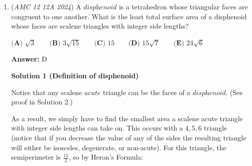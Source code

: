 \begin{enumerate}
 



\textbf{Solution 11 (Options)}

For this question, there are five options: \(28\), \(68\), \(70\), \(72\), and \(84\). Since \(28\) is too small and \(84\) is too large, these two options can be eliminated. At this point, only three options remain. While one could make a guess here, it is better to analyze these remaining options further. When we divide each of these three options by \(2\), we get \(34\), \(35\), and \(36\) respectively. Option C (\(70\)) should be eliminated because, after division by \(2\), it is the only odd number among the three results. Last but not least, Option D (\(72\)) appears excessively frequently in AMC answer choices. Therefore, it is reasonable to conjecture that the Mathematical Association of America (MAA) will avoid using this option again for AMC, leading to the elimination of D. As a result, the only remaining option is B (\(68\)).

 Curator note: Upon extensive investigation, we have been forced to conclude that the above solution is pure undistilled yap.

 Curator\_2 note: He knew the answer and used the solution to make the cheese.

 \href{https://mathproblemsolvingskills.wordpress.com/}{MathProblemSolvingSkills.com}

 


 


	\item (\textit{AMC 12 12A 2024}) A $\textit{disphenoid}$ is a tetrahedron whose triangular faces are congruent to one another. What is the least total surface area of a disphenoid whose faces are scalene triangles with integer side lengths?


 $\textbf{(A) }\sqrt{3}\qquad\textbf{(B) }3\sqrt{15}\qquad\textbf{(C) }15\qquad\textbf{(D) }15\sqrt{7}\qquad\textbf{(E) }24\sqrt{6}$

 \textbf{Answer: }D



\textbf{Solution 1 (Definition of disphenoid)}

Notice that any scalene $\textit{acute}$ triangle can be the faces of a $\textit{disphenoid}$. (See proof in Solution 2.) 

 As a result, we simply have to find the smallest area a scalene acute triangle with integer side lengths can take on. This occurs with a $4,5,6$ triangle (notice that if you decrease the value of any of the sides the resulting triangle will either be isosceles, degenerate, or non-acute). For this triangle, the semiperimeter is $\frac{15}{2}$, so by Heron’s Formula:


\end{enumerate}
